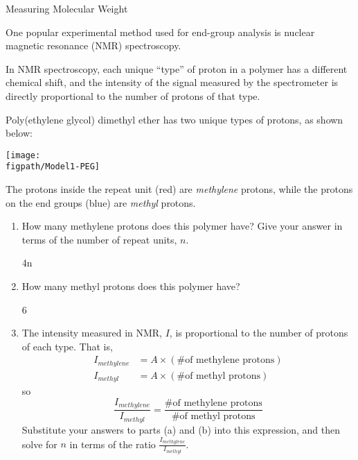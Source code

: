 \begin{activity}{Measuring Molecular Weight}
\begin{infobox}
	One popular experimental method used for end-group analysis is nuclear magnetic resonance (NMR) spectroscopy.
	
	In NMR spectroscopy, each unique ``type'' of proton in a polymer has a different chemical shift, and the intensity of the signal measured by the spectrometer is directly proportional to the number of protons of that type.

\end{infobox}

\begin{ctqs}
		
	\question Poly(ethylene glycol) dimethyl ether has two unique types of protons, as shown below:
	
		\centerline{\texttt{[image: \\figpath/Model1-PEG]}}
		
		\vspace{-8pt}
		The protons inside the repeat unit (red) are \emph{methylene} protons, while the protons on the end groups (blue) are \emph{methyl} protons.
		
		\begin{enumerate}
			\item How many methylene protons does this polymer have?  Give your answer in terms of the number of repeat units, $n$.
			
				\begin{solution}[0.5in]
					4n
				\end{solution}
			
			\item How many methyl protons does this polymer have?
			
				\begin{solution}[0.5in]
					6
				\end{solution}
			
			\item The intensity measured in NMR, $I$, is proportional to the number of protons of each type.  That is, 
				\begin{align*}
					I_{methylene} &= A \times (\text{\# of methylene protons})\\
					I_{methyl} &= A \times (\text{\# of methyl protons})
				\end{align*}
				so
				\begin{equation*}
					\frac{I_{methylene}}{I_{methyl}} = \frac{\text{\# of methylene protons}}{\text{\# of methyl protons}}
				\end{equation*}
				Substitute your answers to parts (a) and (b) into this expression, and then solve for $n$ in terms of the ratio $\frac{I_{methylene}}{I_{methyl}}$.
			

\end{enumerate}
\end{ctqs}
\end{activity}
